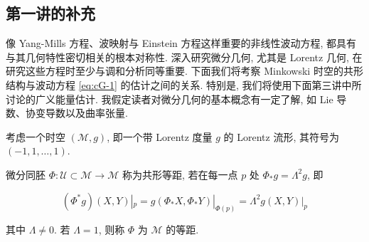 
\subsection{第一讲的补充}

像 Yang-Mills 方程、波映射与 Einstein 方程这样重要的非线性波动方程, 都具有与其几何特性密切相关的根本对称性. 深入研究微分几何, 尤其是 Lorentz 几何, 在研究这些方程时至少与调和分析同等重要. 下面我们将考察 Minkowski 时空的共形结构与波动方程 \eqref{eq:cG-1} 的估计之间的关系. 特别是, 我们将使用下面第三讲中所讨论的广义能量估计. 我假定读者对微分几何的基本概念有一定了解, 如 Lie 导数、协变导数以及曲率张量. 


\begin{definition}\label{def:cG-4.2}
考虑一个时空 $(\mathcal{M},  g)$, 即一个带 Lorentz 度量 $g$ 的 Lorentz 流形, 其符号为 $(-1,  1,  \ldots,  1)$. 

微分同胚 $\Phi: \mathcal{U} \subset \mathcal{M} \to \mathcal{M}$ 称为共形等距, 若在每一点 $p$ 处 $\Phi_{*}g = \Lambda^{2}g$, 即

\[
\left(\Phi^ {*} g\right) (X,  Y) | _ {p} = g \left(\Phi_ {*} X,  \Phi_ {*} Y\right) | _ {\Phi (p)} = \Lambda^ {2} g (X,  Y) | _ {p}
\]

其中 $\Lambda \neq 0$. 若 $\Lambda = 1$, 则称 $\Phi$ 为 $\mathcal{M}$ 的等距. 
\end{definition}

